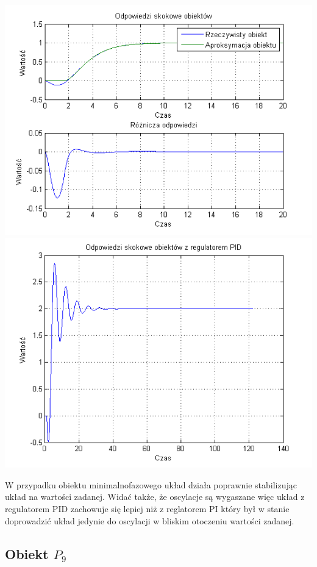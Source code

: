 \documentclass[10pt,a4paper]{article}
\begin{document}
\begin{center}
\includegraphics[scale=1]{images/dwa/skrypt_245.png}\\
\includegraphics[scale=1]{images/dwa/skrypt_246.png}\\
\end{center}
\newpage
W przypadku obiektu minimalnofazowego układ działa poprawnie stabilizując układ na wartości zadanej. Widać także, że oscylacje są wygaszane więc układ z regulatorem PID zachowuje się lepiej niż z reglatorem PI który był w stanie doprowadzić układ jedynie do oscylacji w bliskim otoczeniu wartości zadanej.
\newpage
\subsection{Obiekt $P_9$}
\end{document}
